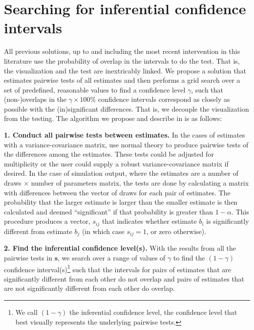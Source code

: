 \section{Searching for inferential confidence intervals}\label{searching-for-inferential-confidence-intervals}

All previous solutions, up to and including the most recent intervention in this literature \citep{radean2023} use the probability of overlap in the intervals to do the test. That is, the visualization and the test are inextricably linked. We propose a solution that estimates pairwise tests of all estimates and then performs a grid search over a set of predefined, reasonable values to find a confidence level \(\gamma\), such that (non-)overlaps in the \(\gamma\times 100\%\) confidence intervals correspond as closely as possible with the (in)significant differences. That is, we decouple the visualization from the testing. The algorithm we propose and describe in \citet{armstrong_2025} is as follows:

\textbf{1. Conduct all pairwise tests between estimates.} In the cases of estimates with a variance-covariance matrix, use normal theory to produce pairwise tests of the differences among the estimates. These tests could be adjusted for multiplicity or the user could supply a robust variance-covariance matrix if desired. In the case of simulation output, where the estimates are a number of draws \(\times\) number of parameters matrix, the tests are done by calculating a matrix with differences between the vector of draws for each pair of estimates. The probability that the larger estimate is larger than the smaller estimate is then calculated and deemed ``significant'' if that probability is greater than \(1-\alpha\). This procedure produces a vector, \(s_{ij}\) that indicates whether estimate \(b_i\) is significantly different from estimate \(b_j\) (in which case \(s_{ij} = 1\), or zero otherwise).

\textbf{2. Find the inferential confidence level(s).} With the results from all the pairwise tests in \(\boldsymbol s\), we search over a range of values of \(\gamma\) to find the \((1-\gamma)\) confidence interval(s)\footnote{We call \((1-\gamma)\) the inferential confidence level, the confidence level that best visually represents the underlying pairwise tests.} such that the intervals for pairs of estimates that are significantly different from each other do not overlap and pairs of estimates that are not significantly different from each other do overlap.

